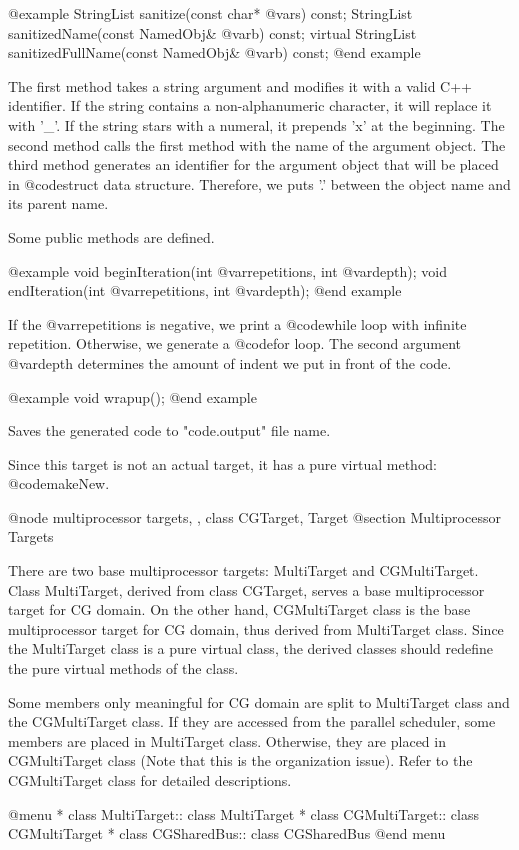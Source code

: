 @example
StringList sanitize(const char* @var{s}) const;
StringList sanitizedName(const NamedObj& @var{b}) const;
virtual StringList sanitizedFullName(const NamedObj& @var{b}) const;
@end example

The first method takes a string argument and modifies it with a valid
C++ identifier. If the string contains a non-alphanumeric character, it
will replace it with '_'. If the string stars with a numeral, it
prepends 'x' at the beginning. The second method calls the first method
with the name of the argument object. The third method generates
an identifier for the argument object that will be placed in @code{struct}
data structure. Therefore, we puts '.' between the object name and its
parent name.

Some public methods are defined.

@example
void beginIteration(int @var{repetitions}, int @var{depth});
void endIteration(int @var{repetitions}, int @var{depth});
@end example

If the @var{repetitions} is negative, we print a @code{while} loop
with infinite repetition. Otherwise, we generate a @code{for}
loop. The second argument @var{depth} determines the amount of indent
we put in front of the code.

@example
void wrapup();
@end example

Saves the generated code to "code.output" file name.

Since this target is not an actual target, it has a pure virtual method:
@code{makeNew}.

@node multiprocessor targets, , class CGTarget, Target
@section Multiprocessor Targets

There are two base multiprocessor targets: MultiTarget and CGMultiTarget.
Class MultiTarget, derived from class CGTarget, serves a base multiprocessor
target for CG domain. On the other hand, CGMultiTarget
class is the base multiprocessor target for CG domain, thus derived from
MultiTarget class. Since the MultiTarget class is a pure virtual class,
the derived classes should redefine the pure virtual methods of the class.

Some members only meaningful for CG domain are split to MultiTarget
class and the CGMultiTarget class. If they are accessed from the parallel
scheduler, some members are placed in MultiTarget class. Otherwise, they
are placed in CGMultiTarget class (Note that this is the organization issue).
Refer to the CGMultiTarget class for detailed descriptions.

@menu
* class MultiTarget::		class MultiTarget
* class CGMultiTarget::		class CGMultiTarget
* class CGSharedBus::		class CGSharedBus
@end menu

